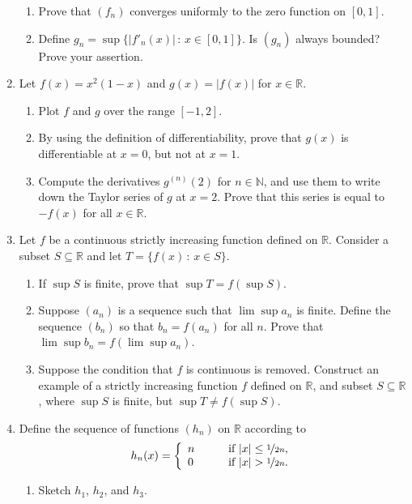 \documentclass[12pt]{article}
\newcommand{\N}{\mathbb{N}}
\newcommand{\R}{\mathbb{R}}
\newcommand{\sep}{\,:\,}
\begin{document}
\begin{enumerate}
    \begin{enumerate}
      \item Prove that $(f_n)$ converges uniformly to the zero function on $[0,1]$.
      \item Define $g_n = \sup \{ |f'_n(x)| \sep x\in [0,1]\}$. Is $(g_n)$
        always bounded? Prove your assertion.
    \end{enumerate}
  \item Let $f(x) = x^2(1-x)$ and $g(x) = |f(x)|$ for $x\in \R$.
    \begin{enumerate}
      \item Plot $f$ and $g$ over the range $[-1,2]$.
      \item By using the definition of differentiability, prove that $g(x)$ is
	differentiable at $x=0$, but not at $x=1$.
      \item Compute the derivatives $g^{(n)}(2)$ for $n\in \N$, and use them
	to write down the Taylor series of $g$ at $x=2$. Prove that this series
	is equal to $-f(x)$ for all $x\in \R$.
    \end{enumerate}
  \item Let $f$ be a continuous strictly increasing function defined on $\R$.
    Consider a subset $S\subseteq \R$ and let $T=\{f(x) \sep x\in S\}$.
    \begin{enumerate}
      \item If $\sup S$ is finite, prove that $\sup T = f(\sup S)$.
      \item Suppose $(a_n)$ is a sequence such that $\lim \sup a_n$ is finite. Define
	the sequence $(b_n)$ so that $b_n=f(a_n)$ for all $n$. Prove that $\lim
	\sup b_n = f(\lim \sup a_n)$.
      \item Suppose the condition that $f$ is continuous is removed. Construct
	an example of a strictly increasing function $f$ defined on $\R$, and
	subset $S\subseteq \R$, where $\sup S$ is finite, but $\sup T \ne
	f(\sup S)$.
    \end{enumerate}
  \item Define the sequence of functions $(h_n)$ on $\R$
    according to
    \[
    h_n(x) = \left\{
    \begin{array}{ll}
      n & \qquad\text{if $|x|\le\nicefrac{1}{2n}$,} \\
      0 & \qquad\text{if $|x|>\nicefrac{1}{2n}$.}
    \end{array}
    \right.
    \]
    \begin{enumerate}
      \item Sketch $h_1$, $h_2$, and $h_3$.

\end{enumerate}
\end{enumerate}
\end{document}
